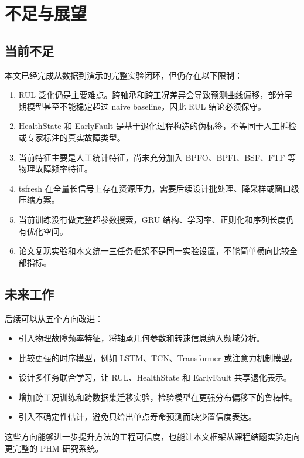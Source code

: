 \section{不足与展望}

\subsection{当前不足}

本文已经完成从数据到演示的完整实验闭环，但仍存在以下限制：

\begin{enumerate}
  \item RUL 泛化仍是主要难点。跨轴承和跨工况差异会导致预测曲线偏移，部分早期模型甚至不能稳定超过 naive baseline，因此 RUL 结论必须保守。
  \item HealthState 和 EarlyFault 是基于退化过程构造的伪标签，不等同于人工拆检或专家标注的真实故障类型。
  \item 当前特征主要是人工统计特征，尚未充分加入 BPFO、BPFI、BSF、FTF 等物理故障频率特征。
  \item tsfresh 在全量长信号上存在资源压力，需要后续设计批处理、降采样或窗口级压缩方案。
  \item 当前训练没有做完整超参数搜索，GRU 结构、学习率、正则化和序列长度仍有优化空间。
  \item 论文复现实验和本文统一三任务框架不是同一实验设置，不能简单横向比较全部指标。
\end{enumerate}

\subsection{未来工作}

后续可以从五个方向改进：

\begin{itemize}
  \item 引入物理故障频率特征，将轴承几何参数和转速信息纳入频域分析。
  \item 比较更强的时序模型，例如 LSTM、TCN、Transformer 或注意力机制模型。
  \item 设计多任务联合学习，让 RUL、HealthState 和 EarlyFault 共享退化表示。
  \item 增加跨工况训练和跨数据集迁移实验，检验模型在更强分布偏移下的鲁棒性。
  \item 引入不确定性估计，避免只给出单点寿命预测而缺少置信度表达。
\end{itemize}

这些方向能够进一步提升方法的工程可信度，也能让本文框架从课程结题实验走向更完整的 PHM 研究系统。
